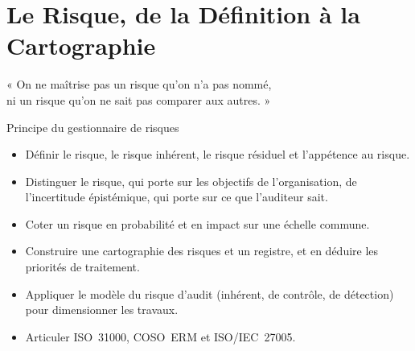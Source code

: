 
\chapter{Le Risque, de la Définition à la Cartographie}
\label{chap:risque}

\epigraph{%
    « On ne maîtrise pas un risque qu'on n'a pas nommé,\\
    ni un risque qu'on ne sait pas comparer aux autres. »%
}{Principe du gestionnaire de risques}


\begin{boxobjectifs}
\begin{itemize}
    \item Définir le risque, le risque inhérent, le risque résiduel et
          l'appétence au risque.
    \item Distinguer le risque, qui porte sur les objectifs de
          l'organisation, de l'incertitude épistémique, qui porte sur ce que
          l'auditeur sait.
    \item Coter un risque en probabilité et en impact sur une échelle
          commune.
    \item Construire une cartographie des risques et un registre, et en
          déduire les priorités de traitement.
    \item Appliquer le modèle du risque d'audit (inhérent, de contrôle, de
          détection) pour dimensionner les travaux.
    \item Articuler ISO~31000, COSO~ERM et ISO/IEC~27005.
\end{itemize}
\end{boxobjectifs}

